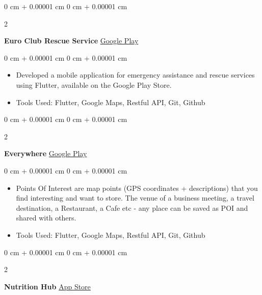 \documentclass[10pt, letterpaper]{article}
\newenvironment{highlights}{
    \begin{itemize}[
        topsep=0.10 cm,
        parsep=0.10 cm,
        partopsep=0pt,
        itemsep=0pt,
        leftmargin=0 cm + 10pt
    ]
}{
    \end{itemize}
} %
\newenvironment{onecolentry}{
    \begin{adjustwidth}{
        0 cm + 0.00001 cm
    }{
        0 cm + 0.00001 cm
    }
}{
    \end{adjustwidth}
} %
\newenvironment{twocolentry}[2][]{
    \onecolentry
    \def\secondColumn{#2}
    \setcolumnwidth{\fill, 4.5 cm}
    \begin{paracol}{2}
}{
    \switchcolumn \raggedleft \secondColumn
    \end{paracol}
    \endonecolentry
} %
\begin{document}
        \vspace{0.2 cm}

        \begin{twocolentry}{
            \href{https://play.google.com/store/apps/details?id=com.euroclub.rescue}{Google Play}
        }
            \textbf{Euro Club Rescue Service
}\end{twocolentry}

        \vspace{0.10 cm}
        \begin{onecolentry}
            \begin{highlights}
                \item Developed a mobile application for emergency assistance and rescue services using Flutter, available on the Google Play Store.
                \item Tools Used: Flutter, Google Maps, Restful API, Git, Github
            \end{highlights}
        \end{onecolentry}


        \vspace{0.2 cm}

        \begin{twocolentry}{
            \href{https://play.google.com/store/apps/details?id=com.everywhere.eg}{Google Play}
        }
            \textbf{Everywhere}\end{twocolentry}

        \vspace{0.10 cm}
        \begin{onecolentry}
            \begin{highlights}
                \item Points Of Interest are map points (GPS coordinates + descriptions) that you find interesting and want to store. The venue of a business meeting, a travel destination, a Restaurant, a Cafe etc - any place can be saved as POI and shared with others.
                \item Tools Used: Flutter, Google Maps, Restful API, Git, Github
            \end{highlights}
        \end{onecolentry}

        \vspace{0.2 cm}

    \begin{twocolentry}{
            \href{https://apps.apple.com/eg/app/\%D9\%85\%D8\%B1\%D9\%83\%D8\%B2-\%D8\%A7\%D9\%84\%D8\%AA\%D8\%BA\%D8\%B0\%D9\%8A\%D8\%A9-nutrition-hub/id6475817915}{App Store}
        }
            \textbf{Nutrition Hub
}\end{twocolentry}
\end{document}
